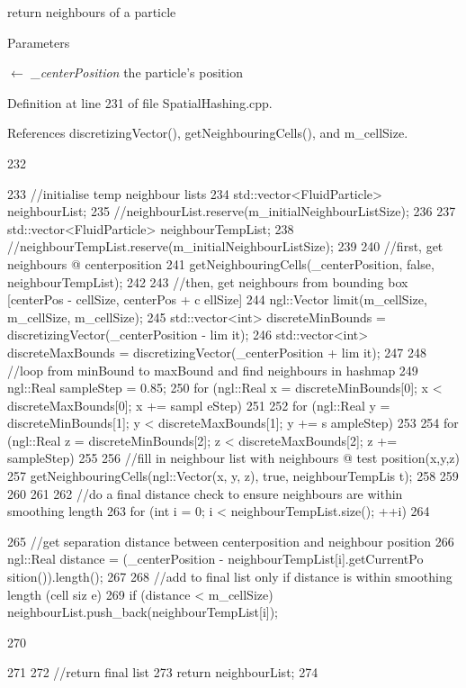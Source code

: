 return neighbours of a particle 


\begin{DoxyParams}{Parameters}
\item[\mbox{$\leftarrow$} {\em \_\-centerPosition}]the particle's position \end{DoxyParams}


Definition at line 231 of file SpatialHashing.cpp.



References discretizingVector(), getNeighbouringCells(), and m\_\-cellSize.




\begin{DoxyCode}
232 {
233     //initialise temp neighbour lists
234     std::vector<FluidParticle> neighbourList;
235     //neighbourList.reserve(m_initialNeighbourListSize);
236 
237     std::vector<FluidParticle> neighbourTempList;
238     //neighbourTempList.reserve(m_initialNeighbourListSize);
239 
240     //first, get neighbours @ centerposition
241     getNeighbouringCells(_centerPosition, false, neighbourTempList);
242 
243     //then, get neighbours from bounding box [centerPos - cellSize, centerPos + c
      ellSize]
244     ngl::Vector limit(m_cellSize, m_cellSize, m_cellSize);
245     std::vector<int> discreteMinBounds = discretizingVector(_centerPosition - lim
      it);
246     std::vector<int> discreteMaxBounds = discretizingVector(_centerPosition + lim
      it);
247 
248     //loop from minBound to maxBound and find neighbours in hashmap
249     ngl::Real sampleStep = 0.85;
250     for (ngl::Real x = discreteMinBounds[0]; x < discreteMaxBounds[0]; x += sampl
      eStep)
251     {
252         for (ngl::Real y = discreteMinBounds[1]; y < discreteMaxBounds[1]; y += s
      ampleStep)
253         {
254             for (ngl::Real z = discreteMinBounds[2]; z < discreteMaxBounds[2]; z 
      += sampleStep)
255             {
256                 //fill in neighbour list with neighbours @ test position(x,y,z)
257                 getNeighbouringCells(ngl::Vector(x, y, z), true, neighbourTempLis
      t);
258             }
259         }
260     }
261 
262     //do a final distance check to ensure neighbours are within smoothing length
263     for (int i = 0; i < neighbourTempList.size(); ++i)
264     {
265         //get separation distance between centerposition and neighbour position
266         ngl::Real distance = (_centerPosition - neighbourTempList[i].getCurrentPo
      sition()).length();
267 
268         //add to final list only if distance is within smoothing length (cell siz
      e)
269         if (distance < m_cellSize) neighbourList.push_back(neighbourTempList[i]);
      
270     }
271 
272     //return final list
273     return neighbourList;
274 }
\end{DoxyCode}




